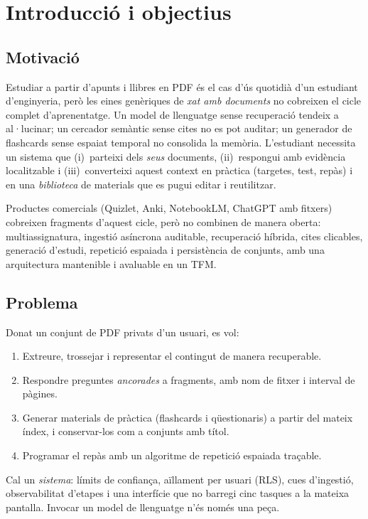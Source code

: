 \chapter{Introducció i objectius}
\label{cap:intro}

\section{Motivació}

Estudiar a partir d'apunts i llibres en PDF és el cas d'ús quotidià d'un estudiant d'enginyeria, però les eines genèriques de \emph{xat amb documents} no cobreixen el cicle complet d'aprenentatge. Un model de llenguatge sense recuperació tendeix a al·lucinar; un cercador semàntic sense cites no es pot auditar; un generador de flashcards sense espaiat temporal no consolida la memòria. L'estudiant necessita un sistema que (i)~parteixi dels \emph{seus} documents, (ii)~respongui amb evidència localitzable i (iii)~converteixi aquest context en pràctica (targetes, test, repàs) i en una \emph{biblioteca} de materials que es pugui editar i reutilitzar.

Productes comercials (Quizlet, Anki, NotebookLM, ChatGPT amb fitxers) cobreixen fragments d'aquest cicle, però no combinen de manera oberta: multiassignatura, ingestió asíncrona auditable, recuperació híbrida, cites clicables, generació d'estudi, repetició espaiada i persistència de conjunts, amb una arquitectura mantenible i avaluable en un TFM.

\section{Problema}

Donat un conjunt de PDF privats d'un usuari, es vol:

\begin{enumerate}
  \item Extreure, trossejar i representar el contingut de manera recuperable.
  \item Respondre preguntes \emph{ancorades} a fragments, amb nom de fitxer i interval de pàgines.
  \item Generar materials de pràctica (flashcards i qüestionaris) a partir del mateix índex, i conservar-los com a conjunts amb títol.
  \item Programar el repàs amb un algoritme de repetició espaiada traçable.
\end{enumerate}

Cal un \emph{sistema}: límits de confiança, aïllament per usuari (RLS), cues d'ingestió, observabilitat d'etapes i una interfície que no barregi cinc tasques a la mateixa pantalla. Invocar un model de llenguatge n'és només una peça.

